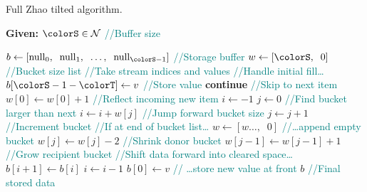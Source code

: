 \begin{algorithm}[H]
\caption{Full Zhao tilted algorithm.}
\label{alg:zhao-tilted-full}
\begin{minipage}{0.5\textwidth}
    \hspace*{\algorithmicindent} \textbf{Given:} $\colorS \in \mathcal{N}$ \textcolor{teal}{\small//Buffer size}
    \hspace*{\algorithmicindent}    \begin{algorithmic}[1]
        \State $b \gets [\mathrm{null}_0,\;\; \mathrm{null}_1, \;\; \ldots, \;\; \mathrm{null}_{\colorS - 1}]$ \textcolor{teal}{\small//Storage buffer}
        \State $w \gets [\colorS, \;\; 0]$ \textcolor{teal}{\small//Bucket size list}
         \textcolor{teal}{\small//Take stream indices and values}
         \textcolor{teal}{\small//Handle initial fill\ldots}
        \State $b[\colorS - 1 - \colorT] \gets v$ \textcolor{teal}{\small//Store value}
        \State \textbf{continue} \textcolor{teal}{\small//Skip to next item}
        \EndIf
        \State $w[0] \gets w[0] + 1$  \textcolor{teal}{\small//Reflect incoming new item}
        \State $i \gets -1$
        \State $j \gets 0$
         \textcolor{teal}{\small//Find bucket larger than next}
        \State $i \gets i + w[j]$ \textcolor{teal}{\small//Jump forward bucket size}
        \State $j \gets j + 1$ \textcolor{teal}{\small//Increment bucket}
         \textcolor{teal}{\small//If at end of bucket list\ldots}
        \State $w \gets [w\ldots,\;\; 0]$ \textcolor{teal}{\small//\ldots append empty bucket}
        \EndIf
        \EndWhile
        \State $w[j] \gets w[j] - 2$ \textcolor{teal}{\small //Shrink donor bucket}
        \State $w[j - 1] \gets w[j - 1] + 1$ \textcolor{teal}{\small //Grow recipient bucket}
         \textcolor{teal}{\small//Shift data forward into cleared space\ldots}
        \State $b[i + 1] \gets b[i]$
        \State $i \gets i - 1$
        \EndWhile
        \State $b[0] \gets v$ \textcolor{teal}{\small// \ldots store new value at front}
        \EndFor
        \Return $b$ \textcolor{teal}{\small//Final stored data}
    \end{algorithmic}
\end{minipage}
\end{algorithm}
